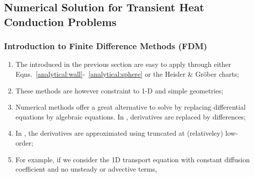 \documentclass[10pt,compress,unknownkeysallowed]{beamer}
\begin{document}
\subsection{Numerical Solution for Transient Heat Conduction Problems}

\begin{frame}
  \frametitle{Introduction to Finite Difference Methods (FDM)}
  \begin{enumerate}
     \item<1-> The  introduced in the previous section are easy to apply through either Eqns.~\ref{analytical:wall}-~\ref{analytical:sphere} or the Heisler $\&$ Gr\"ober charts;
     \item<1-> These methods are however constraint to 1-D and simple geometries;
     \item<2-> Numerical methods offer a great alternative to solve  by replacing differential equations by algebraic equations. In , derivatives are replaced by differences; 
     \item<3-> In , the derivatives are approximated using  truncated at (relativeley) low-order;
     \item<3-> For example, if we consider the 1D transport equation with constant diffusion coefficient and no unsteady or advective terms,
  \end{enumerate}
\end{frame}
\end{document}
